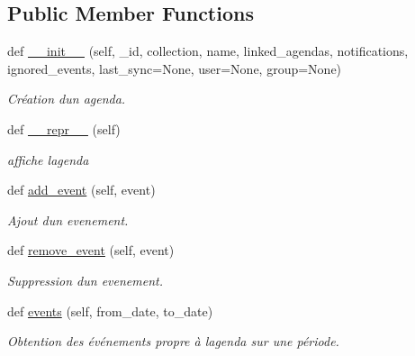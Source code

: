 \subsection*{Public Member Functions}
\begin{DoxyCompactItemize}
\item 
def \mbox{\hyperlink{classSource_1_1core_1_1agenda_1_1Agenda_a38a1269669d7526f710087a278d70c39}{\+\_\+\+\_\+init\+\_\+\+\_\+}} (self, \+\_\+id, collection, name, linked\+\_\+agendas, notifications, ignored\+\_\+events, last\+\_\+sync=None, user=None, group=None)
\begin{DoxyCompactList}\small\item\em Création d\textquotesingle{}un agenda. \end{DoxyCompactList}\item 
\mbox{\label{classSource_1_1core_1_1agenda_1_1Agenda_a3913a072c5efcc3a84111d48ea0b34cc}} 
def \mbox{\hyperlink{classSource_1_1core_1_1agenda_1_1Agenda_a3913a072c5efcc3a84111d48ea0b34cc}{\+\_\+\+\_\+repr\+\_\+\+\_\+}} (self)
\begin{DoxyCompactList}\small\item\em affiche l\textquotesingle{}agenda \end{DoxyCompactList}\item 
def \mbox{\hyperlink{classSource_1_1core_1_1agenda_1_1Agenda_af0e83535fec55d0cd9d15e24db3ae4a5}{add\+\_\+event}} (self, event)
\begin{DoxyCompactList}\small\item\em Ajout d\textquotesingle{}un evenement. \end{DoxyCompactList}\item 
def \mbox{\hyperlink{classSource_1_1core_1_1agenda_1_1Agenda_a2a56040b52078f048e1ce04a647b3ad5}{remove\+\_\+event}} (self, event)
\begin{DoxyCompactList}\small\item\em Suppression d\textquotesingle{}un evenement. \end{DoxyCompactList}\item 
\mbox{\label{classSource_1_1core_1_1agenda_1_1Agenda_ab1529afbf0b57577dade2cc216bdcaaa}} 
def \mbox{\hyperlink{classSource_1_1core_1_1agenda_1_1Agenda_ab1529afbf0b57577dade2cc216bdcaaa}{events}} (self, from\+\_\+date, to\+\_\+date)
\begin{DoxyCompactList}\small\item\em Obtention des événements propre à l\textquotesingle{}agenda sur une période. \end{DoxyCompactList}\item 

\end{DoxyCompactItemize}
